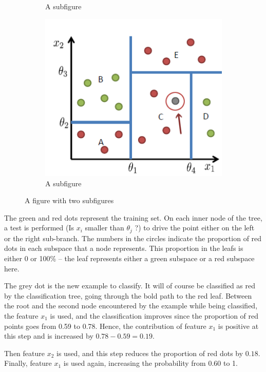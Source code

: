 \documentclass[a4paper,11pt]{kth-mag}
\begin{document}
\begin{figure}[h!]
\begin{subfigure}{.55\textwidth}
  \caption{A subfigure}
  \label{fig:sub1}
\end{subfigure}%
\begin{subfigure}{0.45\textwidth}
  \centering
  \includegraphics[width=1.0\linewidth]{img/decisiontree.png}
  \caption{A subfigure}
  \label{fig:sub2}
\end{subfigure}
\caption{A figure with two subfigures}
\label{fig:test}
\end{figure}

The green and red dots represent the training set. On each inner node of the tree, a test is performed (Is $x_i$ smaller than $\theta_j$ ?) to drive the point either on the left or the right sub-branch. The numbers in the circles indicate the proportion of red dots in each subspace that a node represents. This proportion in the leafs is either 0 or 100\% -- the leaf represents either a green subspace or a red subspace here.

The grey dot is the new example to classify. It will of course be classified as red by the classification tree, going through the bold path to the red leaf. 
Between the root and the second node encountered by the example while being classified, the feature $x_1$ is used, and the classification improves since the proportion of red points goes from 0.59 to 0.78. Hence, the contribution of feature $x_1$ is positive at this step and is increased by $0.78 - 0.59 = 0.19$.

Then feature $x_2$ is used, and this step reduces the proportion of red dots by $0.18$. Finally, feature $x_1$ is used again, increasing the probability from 0.60 to 1. 
\end{document}
